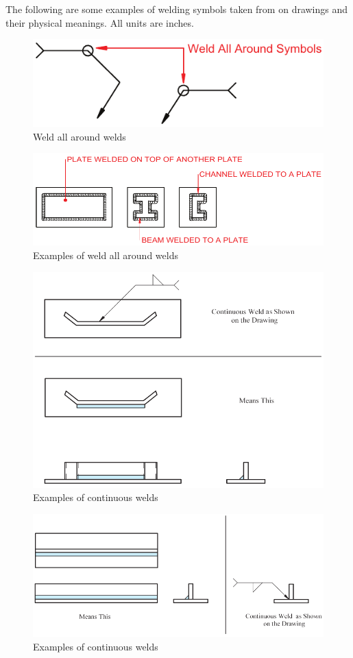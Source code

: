 The following are some examples of welding symbols taken from \citep{Corgan2017} on drawings and their physical meanings. All units are inches.
\begin{figure}[H]
\centering
\includegraphics{PIC/CH07/EXAMPLE/WAR}
\caption{Weld all around welds \citep{Corgan2017}}
\end{figure}
\begin{figure}[H]
\centering
\includegraphics{PIC/CH07/EXAMPLE/WAR2}
\caption{Examples of weld all around welds \citep{Corgan2017}}
\end{figure}
\begin{figure}[H]
\centering
\includegraphics{PIC/CH07/EXAMPLE/CW}
\caption{Examples of continuous welds \citep{Corgan2017}}
\end{figure}
\begin{figure}[H]
\centering
\includegraphics{PIC/CH07/EXAMPLE/CW1}
\caption{Examples of continuous welds \citep{Corgan2017}}
\end{figure}
